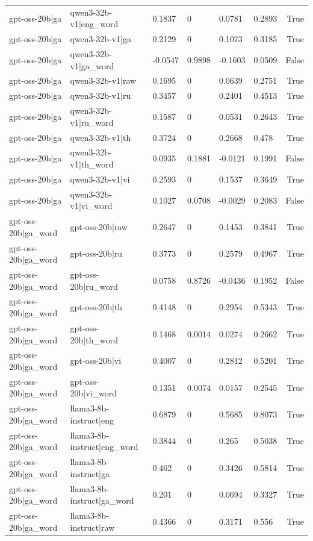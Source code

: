 \begin{table}
\begin{tabular}{llllllr}
gpt-oss-20b|ga & qwen3-32b-v1|eng_word & 0.1837 & 0 & 0.0781 & 0.2893 & True \\
gpt-oss-20b|ga & qwen3-32b-v1|ga & 0.2129 & 0 & 0.1073 & 0.3185 & True \\
gpt-oss-20b|ga & qwen3-32b-v1|ga_word & -0.0547 & 0.9898 & -0.1603 & 0.0509 & False \\
gpt-oss-20b|ga & qwen3-32b-v1|raw & 0.1695 & 0 & 0.0639 & 0.2751 & True \\
gpt-oss-20b|ga & qwen3-32b-v1|ru & 0.3457 & 0 & 0.2401 & 0.4513 & True \\
gpt-oss-20b|ga & qwen3-32b-v1|ru_word & 0.1587 & 0 & 0.0531 & 0.2643 & True \\
gpt-oss-20b|ga & qwen3-32b-v1|th & 0.3724 & 0 & 0.2668 & 0.478 & True \\
gpt-oss-20b|ga & qwen3-32b-v1|th_word & 0.0935 & 0.1881 & -0.0121 & 0.1991 & False \\
gpt-oss-20b|ga & qwen3-32b-v1|vi & 0.2593 & 0 & 0.1537 & 0.3649 & True \\
gpt-oss-20b|ga & qwen3-32b-v1|vi_word & 0.1027 & 0.0708 & -0.0029 & 0.2083 & False \\
gpt-oss-20b|ga_word & gpt-oss-20b|raw & 0.2647 & 0 & 0.1453 & 0.3841 & True \\
gpt-oss-20b|ga_word & gpt-oss-20b|ru & 0.3773 & 0 & 0.2579 & 0.4967 & True \\
gpt-oss-20b|ga_word & gpt-oss-20b|ru_word & 0.0758 & 0.8726 & -0.0436 & 0.1952 & False \\
gpt-oss-20b|ga_word & gpt-oss-20b|th & 0.4148 & 0 & 0.2954 & 0.5343 & True \\
gpt-oss-20b|ga_word & gpt-oss-20b|th_word & 0.1468 & 0.0014 & 0.0274 & 0.2662 & True \\
gpt-oss-20b|ga_word & gpt-oss-20b|vi & 0.4007 & 0 & 0.2812 & 0.5201 & True \\
gpt-oss-20b|ga_word & gpt-oss-20b|vi_word & 0.1351 & 0.0074 & 0.0157 & 0.2545 & True \\
gpt-oss-20b|ga_word & llama3-8b-instruct|eng & 0.6879 & 0 & 0.5685 & 0.8073 & True \\
gpt-oss-20b|ga_word & llama3-8b-instruct|eng_word & 0.3844 & 0 & 0.265 & 0.5038 & True \\
gpt-oss-20b|ga_word & llama3-8b-instruct|ga & 0.462 & 0 & 0.3426 & 0.5814 & True \\
gpt-oss-20b|ga_word & llama3-8b-instruct|ga_word & 0.201 & 0 & 0.0694 & 0.3327 & True \\
gpt-oss-20b|ga_word & llama3-8b-instruct|raw & 0.4366 & 0 & 0.3171 & 0.556 & True \\

\end{tabular}
\end{table}
